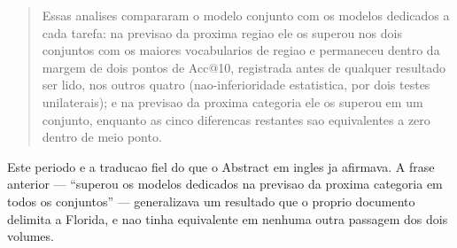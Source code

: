\begin{quote}
Essas analises compararam o modelo conjunto com os modelos dedicados a cada tarefa: na
previsao da proxima regiao ele os superou nos dois conjuntos com os maiores vocabularios de
regiao e permaneceu dentro da margem de dois pontos de Acc@10, registrada antes de qualquer
resultado ser lido, nos outros quatro (nao-inferioridade estatistica, por dois testes
unilaterais); e na previsao da proxima categoria ele os superou em um conjunto, enquanto as
cinco diferencas restantes sao equivalentes a zero dentro de meio ponto.
\end{quote}

\noindent Este periodo e a traducao fiel do que o Abstract em ingles ja afirmava. A frase
anterior --- ``superou os modelos dedicados na previsao da proxima categoria em todos os
conjuntos'' --- generalizava um resultado que o proprio documento delimita a Florida, e nao
tinha equivalente em nenhuma outra passagem dos dois volumes.

%
%

